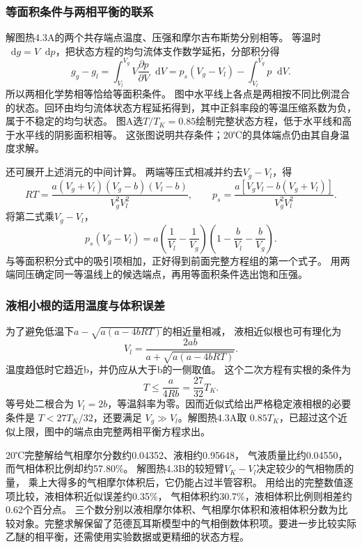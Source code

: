 \documentclass[UTF8,fontset=fandol,a4paper,11pt]{ctexart}
\newcommand{\dd}{\mathop{}\!\mathrm{d}}
\begin{document}
\subsubsection*{等面积条件与两相平衡的联系}
解图热4.3A的两个共存端点温度、压强和摩尔吉布斯势分别相等。
等温时$\dd g=V\dd p$，把状态方程的均匀流体支作数学延拓，分部积分得
\[
g_g-g_l=\int_{V_l}^{V_g}V\frac{\partial p}{\partial V}\dd V
=p_s(V_g-V_l)-\int_{V_l}^{V_g}p\dd V.
\]
所以两相化学势相等恰给等面积条件。
图中水平线上各点是两相按不同比例混合的状态。回环由均匀流体状态方程延拓得到，其中正斜率段的等温压缩系数为负，属于不稳定的均匀状态。
图A选$T/T_K=0.85$绘制完整状态方程，低于水平线和高于水平线的阴影面积相等。
这张图说明共存条件；20℃的具体端点仍由其自身温度求解。

还可展开上述消元的中间计算。
两端等压式相减并约去$V_g-V_l$，得
\[
RT=\frac{a(V_g+V_l)(V_g-b)(V_l-b)}{V_g^2V_l^2},\qquad
p_s=\frac{a[V_gV_l-b(V_g+V_l)]}{V_g^2V_l^2}.
\]
将第二式乘$V_g-V_l$，
\[
p_s(V_g-V_l)=a\left(\frac1{V_l}-\frac1{V_g}\right)
\left(1-\frac b{V_l}-\frac b{V_g}\right).
\]
与等面积积分式中的吸引项相加，正好得到前面完整方程组的第一个式子。
用两端同压确定同一等温线上的候选端点，再用等面积条件选出饱和压强。

\subsubsection*{液相小根的适用温度与体积误差}
为了避免低温下$a-\sqrt{a(a-4bRT)}$的相近量相减，
液相近似根也可有理化为
\[
V_l=\frac{2ab}{a+\sqrt{a(a-4bRT)}}.
\]
温度趋低时它趋近b，并仍应从大于b的一侧取值。
这个二次方程有实根的条件为
\[
T\le\frac{a}{4Rb}=\frac{27}{32}T_K.
\]
等号处二根合为 $V_l=2b$，等温斜率为零。因而近似式给出严格稳定液相根的必要条件是 $T<27T_K/32$，还要满足 $V_g\gg V_l$。解图热4.3A取 $0.85T_K$，已超过这个近似上限，图中的端点由完整两相平衡方程求出。

20℃完整解给气相摩尔分数约0.04352、液相约0.95648，
气液质量比约0.04550，而气相体积比例却约57.80\%。
解图热4.3B的较短臂$V_K-V_l$决定较少的气相物质的量，
乘上大得多的气相摩尔体积后，它仍能占过半管容积。
用给出的完整数值逐项比较，液相体积近似误差约0.35\%，
气相体积约30.7\%，液相体积比例则相差约0.62个百分点。
三个数分别以液相摩尔体积、气相摩尔体积和液相体积分数为比较对象。完整求解保留了范德瓦耳斯模型中的气相倒数体积项。要进一步比较实际乙醚的相平衡，还需使用实验数据或更精细的状态方程。



\end{document}
